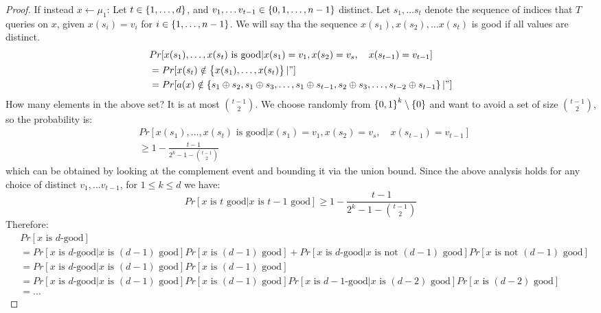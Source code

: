 \begin{proof}
    If instead $x \leftarrow \mu_1$: Let $t \in \set{1, \ldots, d}$, and $v_1, \ldots v_{t-1} \in \set{0, 1, \ldots, n-1}$ distinct. Let $s_1, \ldots s_t$ denote the sequence of indices that $T$ queries on $x$, given $x(s_i) = v_i$ for $i \in \set{1, \ldots, n-1}$. We will say tha the sequence $x(s_1), x(s_2), \ldots x(s_t)$ is good if all values are distinct.
    \begin{align}
        &Pr[x(s_1), \ldots, x(s_t) \text{ is good} \vert x(s_1) = v_1, x(s_2) = v_s, \quad x(s_{t-1}) = v_{t-1}]
        \\ &=  Pr[x(s_t) \notin \set{x(s_1), \ldots, x(s_t)} \vert "]
        \\ &= Pr[a(x) \notin \set{s_1 \oplus s_2, s_1 \oplus s_3, \ldots, s_1 \oplus s_{t-1}, s_2 \oplus s_3, \ldots, s_{t-2} \oplus s_{t-1}}\vert "]
    \end{align}
    How many elements in the above set? It is at most $\binom{t-1}{2}$. We choose randomly from $\set{0, 1}^k \setminus \set{0}$ and want to avoid a set of size $\binom{t-1}{2}$, so the probability is:
    \begin{align}
        &Pr[x(s_1), \ldots, x(s_t) \text{ is good} \vert x(s_1) = v_1, x(s_2) = v_s, \quad x(s_{t-1}) = v_{t-1}]
        \\ &\geq 1 - \frac{t-1}{2^k - 1 - \binom{t-1}{2}}
    \end{align}
    which can be obtained by looking at the complement event and bounding it via the union bound. Since the above analysis holds for any choice of distinct $v_1, \ldots v_{t-1}$, for $1 \leq k \leq d$ we have:
    \begin{equation}
        Pr[\text{$x$ is $t$ good} \vert \text{$x$ is $t-1$ good}] \geq 1 - \frac{t-1}{2^k - 1 - \binom{t-1}{2}}
    \end{equation}
    Therefore:
    \begin{align*}
        &Pr[\text{$x$ is $d$-good}]
        \\ &= Pr[\text{$x$ is $d$-good} \vert \text{$x$ is $(d-1)$ good}]Pr[ \text{$x$ is $(d-1)$ good}] + Pr[\text{$x$ is $d$-good} \vert \text{$x$ is not $(d-1)$ good}]Pr[ \text{$x$ is not $(d-1)$ good}]
        \\ &= Pr[\text{$x$ is $d$-good} \vert \text{$x$ is $(d-1)$ good}]Pr[ \text{$x$ is $(d-1)$ good}]
        \\ &= Pr[\text{$x$ is $d$-good} \vert \text{$x$ is $(d-1)$ good}]Pr[ \text{$x$ is $(d-1)$ good}]Pr[\text{$x$ is $d-1$-good} \vert \text{$x$ is $(d-2)$ good}]Pr[ \text{$x$ is $(d-2)$ good}]
        \\ &= \ldots

\end{align*}
\end{proof}
